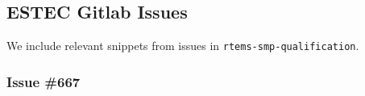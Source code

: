\subsection{ESTEC Gitlab Issues}

We include relevant snippets from issues
in \verb"rtems-smp-qualification".

\subsubsection{Issue \#667}
